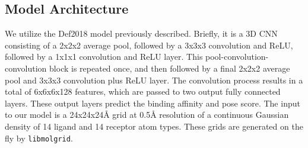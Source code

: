 \documentclass[journal=jcim,manuscript=article]{achemso}
\begin{document}
\subsection{Model Architecture}
We utilize the Def2018 model previously described.\cite{crossdocked2020}
Briefly, it is a 3D CNN consisting of a 2x2x2 average pool, followed by a 3x3x3 convolution and ReLU, followed by a 1x1x1 convolution and ReLU layer. 
This pool-convolution-convolution block is repeated once, and then followed by a final 2x2x2 average pool and 3x3x3 convolution plus ReLU layer.
The convolution process results in a total of 6x6x6x128 features, which are passed to two output fully connected layers.
These output layers predict the binding affinity and pose score.
The input to our model is a 24x24x24{\AA} grid at 0.5{\AA} resolution of a continuous Gaussian density of 14 ligand and 14 receptor atom types.
These grids are generated on the fly by \texttt{libmolgrid}.\cite{sunseri2019libmolgrid}
\end{document}
